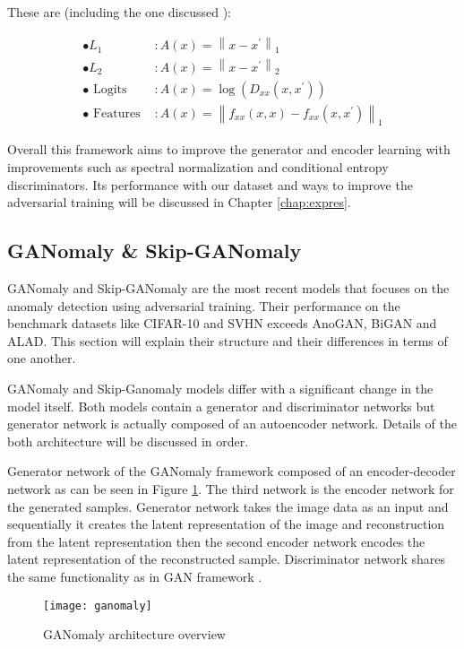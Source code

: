 {These are (including the one discussed ):

\begin{equation}
\begin{aligned} \bullet L_{1} & : A(x)=\left\|x-x^{\prime}\right\|_{1} \\ \bullet L_{2} & : A(x)=\left\|x-x^{\prime}\right\|_{2} \\ \bullet \text { Logits } & : A(x)=\log \left(D_{x x}\left(x, x^{\prime}\right)\right) \\ \bullet \text { Features } & : A(x)=\left\|f_{x x}(x, x)-f_{x x}\left(x, x^{\prime}\right)\right\|_{1} \end{aligned}
\end{equation}

Overall this framework aims to improve the generator and encoder learning with improvements such as spectral
normalization and conditional entropy discriminators. Its performance with our dataset and ways to
improve the adversarial training will be discussed in Chapter \ref{chap:expres}.

\subsection{GANomaly \& Skip-GANomaly}

\label{sec:ganomaly}

GANomaly \cite{Akay2018GANomalySA} and Skip-GANomaly \cite{Akay2019SkipGANomalySC} are the
most recent models that focuses on the anomaly detection using adversarial training. 
Their performance on the benchmark datasets like CIFAR-10
\cite{cifar10} and SVHN \cite{Netzer2011ReadingDI} exceeds AnoGAN, BiGAN and ALAD. This
section will explain their structure and their differences in terms of one another.

GANomaly and Skip-Ganomaly models differ with a significant change in the model itself. Both 
models contain a generator and discriminator networks but generator network is actually composed of an
autoencoder network. Details of the both architecture will be discussed in order.

Generator network of the GANomaly framework composed of an encoder-decoder network as can be seen in
Figure \ref{fig:ganomaly_model}. The third network is the encoder network for the generated samples.
Generator network takes the image data as an input and sequentially it creates the latent
representation of the image and reconstruction from the latent representation then the second
encoder network encodes the latent representation of the reconstructed sample. Discriminator network
shares the same functionality as in GAN framework \cite{Goodfellow:2014:GAN:2969033.2969125}.
\begin{figure}[h!]
	\centering
	\texttt{[image: ganomaly]}
    \caption{GANomaly architecture overview}
    \label{fig:ganomaly_model}
\end{figure}

}
